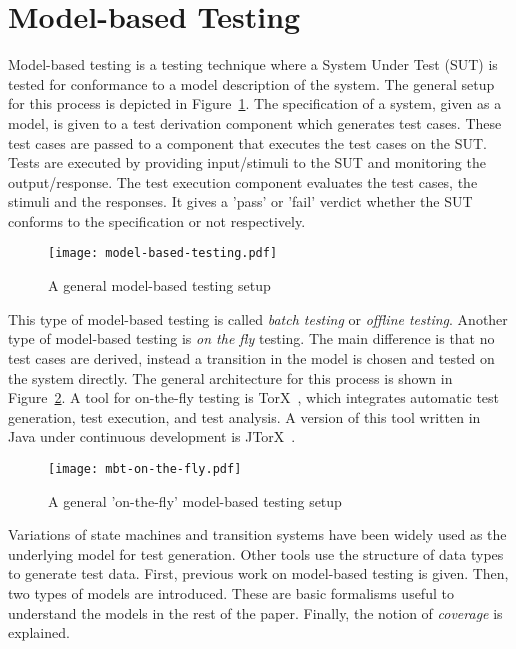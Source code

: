 \section{Model-based Testing}\label{sec:model_based_testing}

Model-based testing is a testing technique where a System Under Test (SUT) is tested for conformance to a model description of the system. The general setup for this process is depicted in Figure~\ref{fig:model_based_testing}. The specification of a system, given as a model, is given to a test derivation component which generates test cases. These test cases are passed to a component that executes the test cases on the SUT. Tests are executed by providing input/stimuli to the SUT and monitoring the output/response. The test execution component evaluates the test cases, the stimuli and the responses. It gives a 'pass' or 'fail' verdict whether the SUT conforms to the specification or not respectively.

\begin{figure}[ht]
  \begin{center}
    \texttt{[image: model-based-testing.pdf]}
  \end{center}
  \caption{A general model-based testing setup}
  \label{fig:model_based_testing}
\end{figure}

This type of model-based testing is called \textit{batch testing} or \textit{offline testing}. Another type of model-based testing is \textit{on the fly} testing. The main difference is that no test cases are derived, instead a transition in the model is chosen and tested on the system directly. The general architecture for this process is shown in Figure~\ref{fig:model_based_testing_on_the_fly}. A tool for on-the-fly testing is TorX~\cite{Tretmans:TorX}, which integrates automatic test generation, test execution, and test analysis. A version of this tool written in Java under continuous development is JTorX~\cite{Belinfante:JTorX}.

\begin{figure}[ht]
  \begin{center}
    \texttt{[image: mbt-on-the-fly.pdf]}
  \end{center}
  \caption{A general 'on-the-fly' model-based testing setup}
  \label{fig:model_based_testing_on_the_fly}
\end{figure}

Variations of state machines and transition systems have been widely used as the underlying model for test generation. Other tools use the structure of data types to generate test data. First, previous work on model-based testing is given. Then, two types of models are introduced. These are basic formalisms useful to understand the models in the rest of the paper. Finally, the notion of \textit{coverage} is explained.

